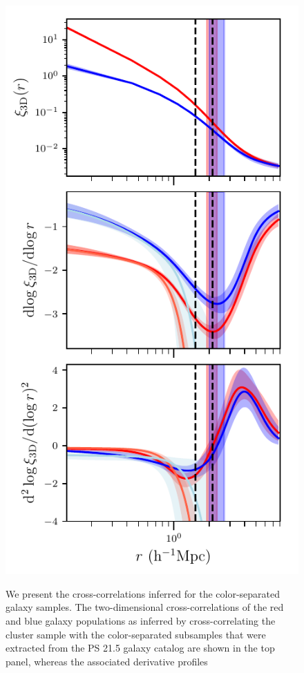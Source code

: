 \documentclass[iop, apjl, twocolappendix, numberedappendix]{emulateapj}
\begin{document}
\begin{figure}
{    \includegraphics[trim = 0mm 2mm 0mm 0mm, clip,scale=0.75]{MAIN_color_results_with_spline_no_mc_2.pdf}}
\caption{We present the cross-correlations inferred for the color-separated
galaxy samples. The two-dimensional cross-correlations
of the red and blue galaxy populations as inferred by
cross-correlating the cluster sample with the color-separated
subsamples that were extracted from the PS 21.5 galaxy catalog are
shown in the top panel, whereas the associated derivative profiles
}
\end{figure}
\end{document}
